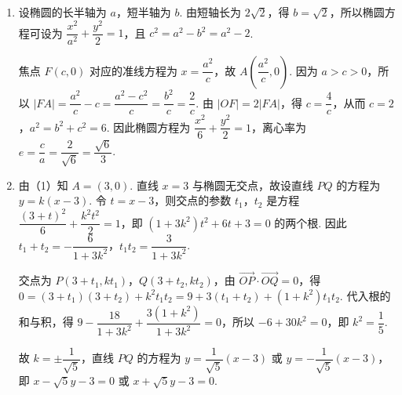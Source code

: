 \begin{solution}
\begin{enumerate}
\item 设椭圆的长半轴为 \(a\)，短半轴为 \(b\). 由短轴长为 \(2\sqrt2\)，得 \(b=\sqrt2\)，所以椭圆方程可设为 \(\dfrac{x^2}{a^2}+\dfrac{y^2}{2}=1\)，且 \(c^2=a^2-b^2=a^2-2\).

焦点 \(F(c,0)\) 对应的准线方程为 \(x=\dfrac{a^2}{c}\)，故 \(A\left(\dfrac{a^2}{c},0\right)\). 因为 \(a>c>0\)，所以
\(|FA|=\dfrac{a^2}{c}-c=\dfrac{a^2-c^2}{c}=\dfrac{b^2}{c}=\dfrac2c\). 由 \(|OF|=2|FA|\)，得 \(c=\dfrac4c\)，从而 \(c=2\)，\(a^2=b^2+c^2=6\). 因此椭圆方程为
\(\dfrac{x^2}{6}+\dfrac{y^2}{2}=1\)，离心率为 \(e=\dfrac ca=\dfrac{2}{\sqrt6}=\dfrac{\sqrt6}{3}\).
\item 由（1）知 \(A=(3,0)\). 直线 \(x=3\) 与椭圆无交点，故设直线 \(PQ\) 的方程为 \(y=k(x-3)\). 令 \(t=x-3\)，则交点的参数 \(t_1\)，\(t_2\) 是方程
\(\dfrac{(3+t)^2}{6}+\dfrac{k^2t^2}{2}=1\)，即 \((1+3k^2)t^2+6t+3=0\) 的两个根. 因此
\(t_1+t_2=-\dfrac6{1+3k^2}\)，\(t_1t_2=\dfrac3{1+3k^2}\).

交点为 \(P(3+t_1,kt_1)\)，\(Q(3+t_2,kt_2)\)，由 \(\overrightarrow{OP}\cdot\overrightarrow{OQ}=0\)，得
\(0=(3+t_1)(3+t_2)+k^2t_1t_2=9+3(t_1+t_2)+(1+k^2)t_1t_2\). 代入根的和与积，得
\(9-\dfrac{18}{1+3k^2}+\dfrac{3(1+k^2)}{1+3k^2}=0\)，所以 \(-6+30k^2=0\)，即 \(k^2=\dfrac15\).

故 \(k=\pm\dfrac1{\sqrt5}\)，直线 \(PQ\) 的方程为
\(y=\dfrac1{\sqrt5}(x-3)\) 或 \(y=-\dfrac1{\sqrt5}(x-3)\)，即 \(x-\sqrt5y-3=0\) 或 \(x+\sqrt5y-3=0\).
\end{enumerate}
\end{solution}
